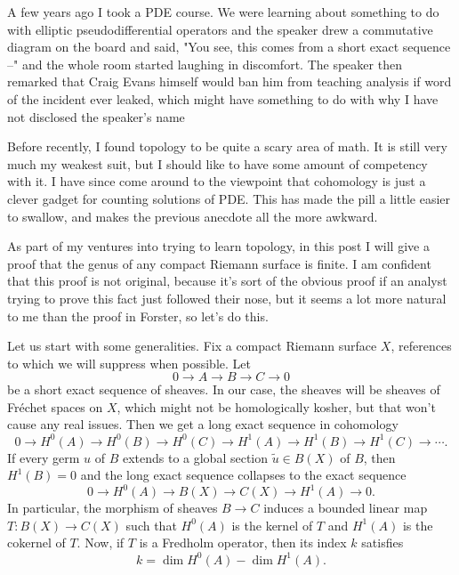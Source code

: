 \documentclass[12pt]{article}
\begin{document}

A few years ago I took a PDE course. We were learning about something to do with elliptic pseudodifferential operators and the speaker drew a commutative diagram on the board and said, "You see, this comes from a short exact sequence --" and the whole room started laughing in discomfort.
The speaker then remarked that Craig Evans himself would ban him from teaching analysis if word of the incident ever leaked, which might have something to do with why I have not disclosed the speaker's name

Before recently, I found topology to be quite a scary area of math. It is still very much my weakest suit, but I should like to have some amount of competency with it.
I have since come around to the viewpoint that cohomology is just a clever gadget for counting solutions of PDE.
This has made the pill a little easier to swallow, and makes the previous anecdote all the more awkward.

As part of my ventures into trying to learn topology, in this post I will give a proof that the genus of any compact Riemann surface is finite.
I am confident that this proof is not original, because it's sort of the obvious proof if an analyst trying to prove this fact just followed their nose, but it seems a lot more natural to me than the proof in Forster, so let's do this.

Let us start with some generalities.
Fix a compact Riemann surface $X$, references to which we will suppress when possible.
Let
$$0 \to A \to B \to C \to 0$$
be a short exact sequence of sheaves.
In our case, the sheaves will be sheaves of Fréchet spaces on $X$, which might not be homologically kosher, but that won't cause any real issues.
Then we get a long exact sequence in cohomology
$$0 \to H^0(A) \to H^0(B) \to H^0(C) \to H^1(A) \to H^1(B) \to H^1(C) \to \cdots.$$
If every germ $u$ of $B$ extends to a global section $\tilde u \in B(X)$ of $B$, then $H^1(B) = 0$ and the long exact sequence collapses to the exact sequence
$$0 \to H^0(A) \to B(X) \to C(X) \to H^1(A) \to 0.$$
In particular, the morphism of sheaves $B \to C$ induces a bounded linear map $T: B(X) \to C(X)$ such that $H^0(A)$ is the kernel of $T$ and $H^1(A)$ is the cokernel of $T$.
Now, if $T$ is a Fredholm operator, then its index $k$ satisfies
$$k = \operatorname{dim} H^0(A) - \operatorname{dim} H^1(A).$$
\end{document}
